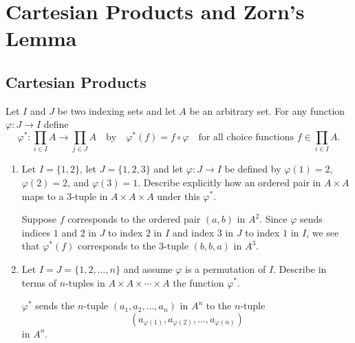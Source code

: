 \appendix
\chapter{Cartesian Products and Zorn's Lemma}

\section{Cartesian Products}

 Let $I$ and $J$ be two indexing sets and let $A$ be an
arbitrary set. For any function $\varphi\colon J\to I$ define
\begin{equation*}
  \varphi^*\colon\prod_{i\in I}A\to\prod_{j\in J}A
  \quad\text{by}\quad
  \varphi^*(f) = f\circ\varphi
  \quad\text{for all choice functions $f\in\prod_{i\in I}A$}.
\end{equation*}
\begin{enumerate}
\item Let $I = \{1, 2\}$, let $J = \{1, 2, 3\}$ and let
  $\varphi\colon J\to I$ be defined by $\varphi(1) = 2$,
  $\varphi(2) = 2$, and $\varphi(3) = 1$. Describe explicitly how an
  ordered pair in $A\times A$ maps to a $3$-tuple in
  $A\times A\times A$ under this $\varphi^*$.
  \begin{solution}
    Suppose $f$ corresponds to the ordered pair $(a,b)$ in
    $A^2$. Since $\varphi$ sends indices $1$ and $2$ in $J$ to index
    $2$ in $I$ and index $3$ in $J$ to index $1$ in $I$, we see that
    $\varphi^*(f)$ corresponds to the $3$-tuple $(b,b,a)$ in $A^3$.
  \end{solution}
\item Let $I = J = \{1,2,\dots,n\}$ and assume $\varphi$ is a
  permutation of $I$. Describe in terms of $n$-tuples in
  $A\times A\times\cdots\times A$ the function $\varphi^*$.
  \begin{solution}
    $\varphi^*$ sends the $n$-tuple $(a_1,a_2,\dots,a_n)$ in $A^n$ to
    the $n$-tuple
    \begin{equation*}
      (a_{\varphi(1)},a_{\varphi(2)},\dots,a_{\varphi(n)})
    \end{equation*}
    in $A^n$.
  \end{solution}
\end{enumerate}

